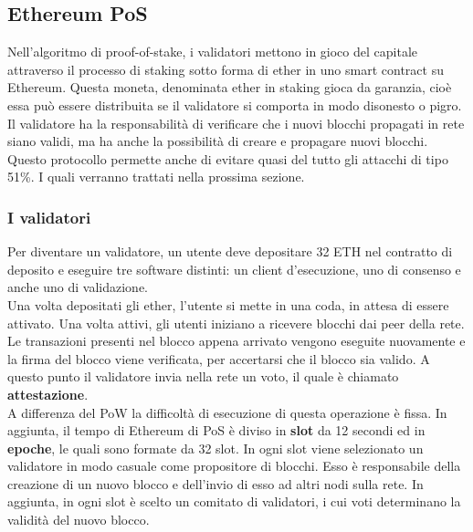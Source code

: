 \documentclass[a4paper,11pt]{report}
\begin{document}
\subsection{Ethereum PoS}
Nell'algoritmo di proof-of-stake, i validatori mettono in gioco del capitale attraverso il processo di staking sotto forma di ether in uno smart contract su Ethereum. Questa moneta, denominata ether in staking gioca da garanzia, cioè essa può essere distribuita se il validatore si comporta in modo disonesto o pigro. Il validatore ha la responsabilità di verificare che i nuovi blocchi propagati in rete siano validi, ma ha anche la possibilità di creare e propagare nuovi blocchi. \\
Questo protocollo permette anche di evitare quasi del tutto gli attacchi di tipo 51\%. I quali verranno trattati nella prossima sezione.

\subsubsection{I validatori}
Per diventare un validatore, un utente deve depositare 32 ETH nel contratto di deposito e eseguire tre software distinti: un client d'esecuzione, uno di consenso e anche uno di validazione.\\
Una volta depositati gli ether, l'utente si mette in una coda, in attesa di essere attivato. Una volta attivi, gli utenti iniziano a ricevere blocchi dai peer della rete. Le transazioni presenti nel blocco appena arrivato vengono eseguite nuovamente e la firma del blocco viene verificata, per accertarsi che il blocco sia valido. A questo punto il validatore invia nella rete un voto, il quale è chiamato \textbf{attestazione}.\\

A differenza del PoW la difficoltà di esecuzione di questa operazione è fissa. In aggiunta, il tempo di Ethereum di PoS è diviso in \textbf{slot} da 12 secondi ed in \textbf{epoche}, le quali sono formate da 32 slot. In ogni slot viene selezionato un validatore in modo casuale come propositore di blocchi. Esso è responsabile della creazione di un nuovo blocco e dell'invio di esso ad altri nodi sulla rete. In aggiunta, in ogni slot è scelto un comitato di validatori, i cui voti determinano la validità del nuovo blocco. 
\end{document}
